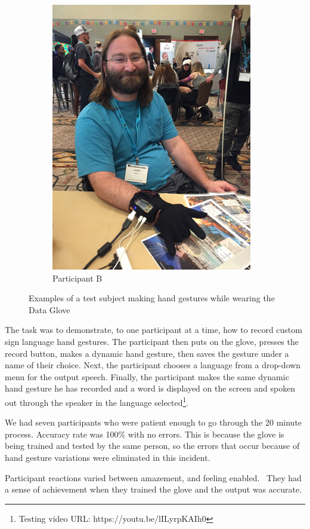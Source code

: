 \begin{figure}
\begin{subfigure}{.4\linewidth}
        \includegraphics{./assets/img/ParticipantB}
        \caption{Participant B}
        \label{fig:participantb}
    \end{subfigure}
    \caption{Examples of a test subject making hand gestures while wearing the Data Glove}
    \label{fig:participants}
\end{figure}

The task was to demonstrate, to one participant at a time, how to record custom sign language hand gestures. The participant then puts on the glove, presses the record button, makes a dynamic hand gesture, then saves the gesture under a name of their choice. Next, the participant chooses a language from a drop-down menu for the output speech. Finally, the participant makes the same dynamic hand gesture he has recorded and a word is displayed on the screen and spoken out through the speaker in the language selected\footnote{Testing video URL: https://youtu.be/lILyrpKAIh0}. 

We had seven participants who were patient enough to go through the 20 minute process. Accuracy rate was 100\% with no errors. This is because the glove is being trained and tested by the same person, so the errors that occur because of hand gesture variations were eliminated in this incident.  

Participant reactions varied between amazement, and feeling enabled.  They had a sense of achievement when they trained the glove and the output was accurate. 

